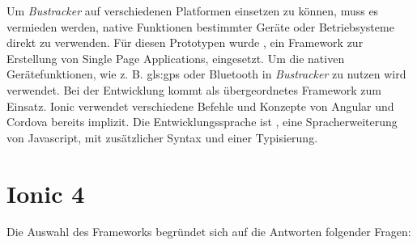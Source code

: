 Um \emph{Bustracker} auf verschiedenen Platformen einsetzen zu können, muss es vermieden werden, native Funktionen bestimmter Geräte oder Betriebsysteme direkt zu verwenden. Für diesen Prototypen wurde , ein Framework zur Erstellung von Single Page Applications, eingesetzt. Um die nativen Gerätefunktionen, wie z. B. \gls{gls:gps} oder Bluetooth in \emph{Bustracker} zu nutzen wird  verwendet. 
Bei der Entwicklung kommt  als übergeordnetes Framework zum Einsatz. Ionic verwendet verschiedene Befehle und Konzepte von Angular und Cordova bereits implizit. 
Die Entwicklungssprache ist , eine Spracherweiterung von Javascript, mit zusätzlicher Syntax und einer Typisierung.
 

\section{Ionic 4}
\label{ionic}
Die Auswahl des Frameworks begründet sich auf die Antworten folgender Fragen:
